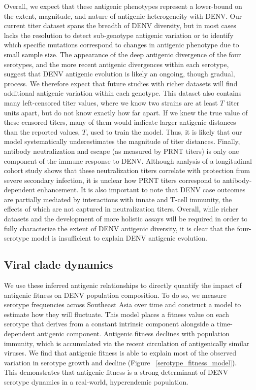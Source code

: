 \documentclass[11pt,oneside,letterpaper]{article}
\begin{document}
Overall, we expect that these antigenic phenotypes represent a lower-bound on the extent, magnitude, and nature of antigenic heterogeneity with DENV.
Our current titer dataset spans the breadth of DENV diversity, but in most cases lacks the resolution to detect sub-genotype antigenic variation or to identify which specific mutations correspond to changes in antigenic phenotype due to small sample size.
The appearance of the deep antigenic divergence of the four serotypes, and the more recent antigenic divergences within each serotype, suggest that DENV antigenic evolution is likely an ongoing, though gradual, process.
We therefore expect that future studies with richer datasets will find additional antigenic variation within each genotype.
This dataset also contains many left-censored titer values, where we know two strains are at least $T$ titer units apart, but do not know exactly how far apart.
If we knew the true value of these censored titers, many of them would indicate larger antigenic distances than the reported values, $T$, used to train the model.
Thus, it is likely that our model systematically underestimates the magnitude of titer distances.
Finally, antibody neutralization and escape (as measured by PRNT titers) is only one component of the immune response to DENV.
Although analysis of a longitudinal cohort study shows that these neutralization titers correlate with protection from severe secondary infection, it is unclear how PRNT titers correspond to antibody-dependent enhancement.
It is also important to note that DENV case outcomes are partially mediated by interactions with innate and T-cell immunity, the effects of which are not captured in neutralization titers.
Overall, while richer datasets and the development of more holistic assays will be required in order to fully characterize the extent of DENV antigenic diversity, it is clear that the four-serotype model is insufficient to explain DENV antigenic evolution.

\subsection*{Viral clade dynamics}
We use these inferred antigenic relationships to directly quantify the impact of antigenic fitness on DENV population composition.
To do so, we measure serotype frequencies across Southeast Asia over time and construct a model to estimate how they will fluctuate.
This model places a fitness value on each serotype that derives from a constant intrinsic component alongside a time-dependent antigenic component.
Antigenic fitness declines with population immunity, which is accumulated via the recent circulation of antigenically similar viruses.
We find that antigenic fitness is able to explain most of the observed variation in serotype growth and decline (Figure ~\ref{serotype_fitness_model}).
This demonstrates that antigenic fitness is a strong determinant of DENV serotype dynamics in a real-world, hyperendemic population.
\end{document}
